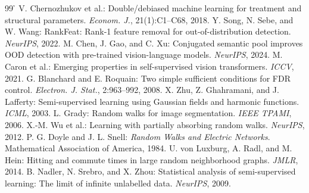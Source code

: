 {\renewcommand{\refname}{付録の参考文献}
\begin{thebibliography}{99}
\footnotesize{}\h\setlength{\itemsep}{0pt}\setlength{\parskip}{0pt}\setlength{\parsep}{0pt}
 V. Chernozhukov et al.: Double/debiased machine learning for treatment and structural parameters. \textit{Econom. J.}, 21(1):C1--C68, 2018.
 Y. Song, N. Sebe, and W. Wang: RankFeat: Rank-1 feature removal for out-of-distribution detection. \textit{NeurIPS}, 2022.
 M. Chen, J. Gao, and C. Xu: Conjugated semantic pool improves OOD detection with pre-trained vision-language models. \textit{NeurIPS}, 2024.
 M. Caron et al.: Emerging properties in self-supervised vision transformers. \textit{ICCV}, 2021.
 G. Blanchard and E. Roquain: Two simple sufficient conditions for FDR control. \textit{Electron. J. Stat.}, 2:963--992, 2008.
 X. Zhu, Z. Ghahramani, and J. Lafferty: Semi-supervised learning using Gaussian fields and harmonic functions. \textit{ICML}, 2003.
 L. Grady: Random walks for image segmentation. \textit{IEEE TPAMI}, 2006.
 X.-M. Wu et al.: Learning with partially absorbing random walks. \textit{NeurIPS}, 2012.
 P. G. Doyle and J. L. Snell: \textit{Random Walks and Electric Networks}. Mathematical Association of America, 1984.
 U. von Luxburg, A. Radl, and M. Hein: Hitting and commute times in large random neighborhood graphs. \textit{JMLR}, 2014.
 B. Nadler, N. Srebro, and X. Zhou: Statistical analysis of semi-supervised learning: The limit of infinite unlabelled data. \textit{NeurIPS}, 2009.
\end{thebibliography}}
